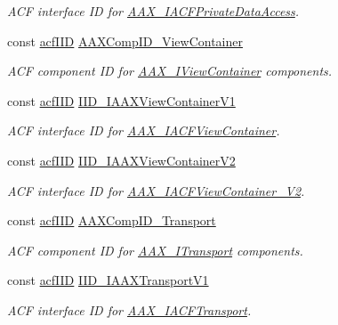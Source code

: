 \begin{Indent}
\begin{DoxyCompactItemize}
\begin{DoxyCompactList}\small\item\em A\+CF interface ID for \mbox{\hyperlink{a01741}{A\+A\+X\+\_\+\+I\+A\+C\+F\+Private\+Data\+Access}}. \end{DoxyCompactList}\item 
const \mbox{\hyperlink{a00269_a59df0b41744eee7a066787aaedf97f67}{acf\+I\+ID}} \mbox{\hyperlink{a00683_a2e198bb97b311f9919ad1f61862be5e9}{A\+A\+X\+Comp\+I\+D\+\_\+\+View\+Container}}
\begin{DoxyCompactList}\small\item\em A\+CF component ID for \mbox{\hyperlink{a01889}{A\+A\+X\+\_\+\+I\+View\+Container}} components. \end{DoxyCompactList}\item 
const \mbox{\hyperlink{a00269_a59df0b41744eee7a066787aaedf97f67}{acf\+I\+ID}} \mbox{\hyperlink{a00683_a854aa90e4fa7f91dae9282fe008d4005}{I\+I\+D\+\_\+\+I\+A\+A\+X\+View\+Container\+V1}}
\begin{DoxyCompactList}\small\item\em A\+CF interface ID for \mbox{\hyperlink{a01765}{A\+A\+X\+\_\+\+I\+A\+C\+F\+View\+Container}}. \end{DoxyCompactList}\item 
const \mbox{\hyperlink{a00269_a59df0b41744eee7a066787aaedf97f67}{acf\+I\+ID}} \mbox{\hyperlink{a00683_ade506fadfb23a9f4deb4be228b1f6fa8}{I\+I\+D\+\_\+\+I\+A\+A\+X\+View\+Container\+V2}}
\begin{DoxyCompactList}\small\item\em A\+CF interface ID for \mbox{\hyperlink{a01769}{A\+A\+X\+\_\+\+I\+A\+C\+F\+View\+Container\+\_\+\+V2}}. \end{DoxyCompactList}\item 
const \mbox{\hyperlink{a00269_a59df0b41744eee7a066787aaedf97f67}{acf\+I\+ID}} \mbox{\hyperlink{a00683_aa407c13a2ddcc4c1078acb837c76003e}{A\+A\+X\+Comp\+I\+D\+\_\+\+Transport}}
\begin{DoxyCompactList}\small\item\em A\+CF component ID for \mbox{\hyperlink{a01885}{A\+A\+X\+\_\+\+I\+Transport}} components. \end{DoxyCompactList}\item 
const \mbox{\hyperlink{a00269_a59df0b41744eee7a066787aaedf97f67}{acf\+I\+ID}} \mbox{\hyperlink{a00683_af0982d7ceed67bd8b50476193cdbc7c3}{I\+I\+D\+\_\+\+I\+A\+A\+X\+Transport\+V1}}
\begin{DoxyCompactList}\small\item\em A\+CF interface ID for \mbox{\hyperlink{a01757}{A\+A\+X\+\_\+\+I\+A\+C\+F\+Transport}}. \end{DoxyCompactList}\item 

\end{DoxyCompactItemize}
\end{Indent}
